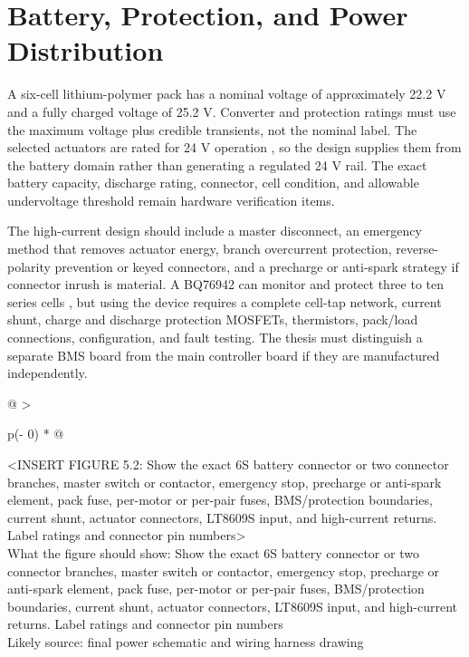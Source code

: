 \section{Battery, Protection, and Power Distribution}\label{battery-protection-and-power-distribution}

A six-cell lithium-polymer pack has a nominal voltage of approximately
22.2 V and a fully charged voltage of 25.2 V. Converter and protection
ratings must use the maximum voltage plus credible transients, not the
nominal label. The selected actuators are rated for 24 V operation
\cite{cubemars2026ak4010}, so the design supplies them from the battery domain rather
than generating a regulated 24 V rail. The exact battery capacity,
discharge rating, connector, cell condition, and allowable undervoltage
threshold remain hardware verification items.

The high-current design should include a master disconnect, an emergency
method that removes actuator energy, branch overcurrent protection,
reverse-polarity prevention or keyed connectors, and a precharge or
anti-spark strategy if connector inrush is material. A BQ76942 can
monitor and protect three to ten series cells \cite{ti2026bq76942}, but using the
device requires a complete cell-tap network, current shunt, charge and
discharge protection MOSFETs, thermistors, pack\slash{}load connections,
configuration, and fault testing. The thesis must distinguish a separate
BMS board from the main controller board if they are manufactured
independently.

\begin{longtable}[]{@{}
  >{\raggedright\arraybackslash}p{(\columnwidth - 0\tabcolsep) * }@{}}
\toprule\noalign{}
\begin{minipage}[b]{\linewidth}\raggedright
\textless INSERT FIGURE 5.2: Show the exact 6S battery connector or two
connector branches, master switch or contactor, emergency stop,
precharge or anti-spark element, pack fuse, per-motor or per-pair fuses,
BMS\slash{}protection boundaries, current shunt, actuator connectors, LT8609S
input, and high-current returns. Label ratings and connector pin
numbers\textgreater{}\\
What the figure should show: Show the exact 6S battery connector or two
connector branches, master switch or contactor, emergency stop,
precharge or anti-spark element, pack fuse, per-motor or per-pair fuses,
BMS\slash{}protection boundaries, current shunt, actuator connectors, LT8609S
input, and high-current returns. Label ratings and connector pin
numbers\\
Likely source: final power schematic and wiring harness drawing\strut
\end{minipage} \\
\midrule\noalign{}
\endhead
\bottomrule\noalign{}
\endlastfoot
\end{longtable}

